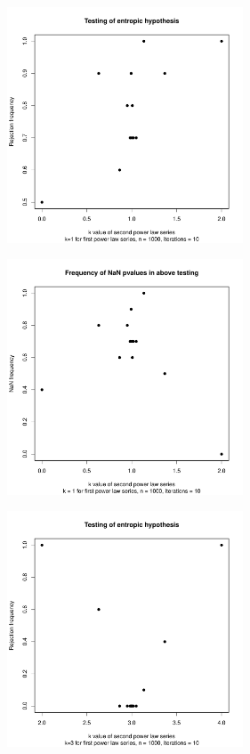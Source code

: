 \begin{figure}
    \centering
    \begin{subfigure}[b]{0.3\textwidth}
        \centering
        \includegraphics[height=7cm,keepaspectratio]{./powerlaw/rejectionPlot,k1=1,n=1000,iterations=10.pdf}
    \end{subfigure}
    \hfill
    \begin{subfigure}[b]{0.5\textwidth}
        \centering
        \includegraphics[height=7cm,keepaspectratio]{./powerlaw/NaNPlot,k1=1,n=1000,iterations=10.pdf}
    \end{subfigure}
    \vfill
    \begin{subfigure}[b]{0.3\textwidth}
        \centering
        \includegraphics[height=7cm,keepaspectratio]{./powerlaw/rejectionPlot,k1=3,n=1000,iterations=10.pdf}

\end{subfigure}
\end{figure}
